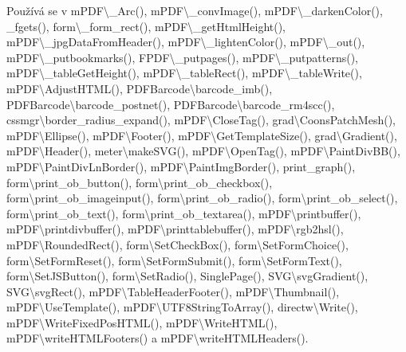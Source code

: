 Používá se v m\-P\-D\-F\textbackslash{}\-\_\-\-Arc(), m\-P\-D\-F\textbackslash{}\-\_\-conv\-Image(), m\-P\-D\-F\textbackslash{}\-\_\-darken\-Color(), \-\_\-fgets(), form\textbackslash{}\-\_\-form\-\_\-rect(), m\-P\-D\-F\textbackslash{}\-\_\-get\-Html\-Height(), m\-P\-D\-F\textbackslash{}\-\_\-jpg\-Data\-From\-Header(), m\-P\-D\-F\textbackslash{}\-\_\-lighten\-Color(), m\-P\-D\-F\textbackslash{}\-\_\-out(), m\-P\-D\-F\textbackslash{}\-\_\-putbookmarks(), F\-P\-D\-F\textbackslash{}\-\_\-putpages(), m\-P\-D\-F\textbackslash{}\-\_\-putpatterns(), m\-P\-D\-F\textbackslash{}\-\_\-table\-Get\-Height(), m\-P\-D\-F\textbackslash{}\-\_\-table\-Rect(), m\-P\-D\-F\textbackslash{}\-\_\-table\-Write(), m\-P\-D\-F\textbackslash{}\-Adjust\-H\-T\-M\-L(), P\-D\-F\-Barcode\textbackslash{}barcode\-\_\-imb(), P\-D\-F\-Barcode\textbackslash{}barcode\-\_\-postnet(), P\-D\-F\-Barcode\textbackslash{}barcode\-\_\-rm4scc(), cssmgr\textbackslash{}border\-\_\-radius\-\_\-expand(), m\-P\-D\-F\textbackslash{}\-Close\-Tag(), grad\textbackslash{}\-Coons\-Patch\-Mesh(), m\-P\-D\-F\textbackslash{}\-Ellipse(), m\-P\-D\-F\textbackslash{}\-Footer(), m\-P\-D\-F\textbackslash{}\-Get\-Template\-Size(), grad\textbackslash{}\-Gradient(), m\-P\-D\-F\textbackslash{}\-Header(), meter\textbackslash{}make\-S\-V\-G(), m\-P\-D\-F\textbackslash{}\-Open\-Tag(), m\-P\-D\-F\textbackslash{}\-Paint\-Div\-B\-B(), m\-P\-D\-F\textbackslash{}\-Paint\-Div\-Ln\-Border(), m\-P\-D\-F\textbackslash{}\-Paint\-Img\-Border(), print\-\_\-graph(), form\textbackslash{}print\-\_\-ob\-\_\-button(), form\textbackslash{}print\-\_\-ob\-\_\-checkbox(), form\textbackslash{}print\-\_\-ob\-\_\-imageinput(), form\textbackslash{}print\-\_\-ob\-\_\-radio(), form\textbackslash{}print\-\_\-ob\-\_\-select(), form\textbackslash{}print\-\_\-ob\-\_\-text(), form\textbackslash{}print\-\_\-ob\-\_\-textarea(), m\-P\-D\-F\textbackslash{}printbuffer(), m\-P\-D\-F\textbackslash{}printdivbuffer(), m\-P\-D\-F\textbackslash{}printtablebuffer(), m\-P\-D\-F\textbackslash{}rgb2hsl(), m\-P\-D\-F\textbackslash{}\-Rounded\-Rect(), form\textbackslash{}\-Set\-Check\-Box(), form\textbackslash{}\-Set\-Form\-Choice(), form\textbackslash{}\-Set\-Form\-Reset(), form\textbackslash{}\-Set\-Form\-Submit(), form\textbackslash{}\-Set\-Form\-Text(), form\textbackslash{}\-Set\-J\-S\-Button(), form\textbackslash{}\-Set\-Radio(), Single\-Page(), S\-V\-G\textbackslash{}svg\-Gradient(), S\-V\-G\textbackslash{}svg\-Rect(), m\-P\-D\-F\textbackslash{}\-Table\-Header\-Footer(), m\-P\-D\-F\textbackslash{}\-Thumbnail(), m\-P\-D\-F\textbackslash{}\-Use\-Template(), m\-P\-D\-F\textbackslash{}\-U\-T\-F8\-String\-To\-Array(), directw\textbackslash{}\-Write(), m\-P\-D\-F\textbackslash{}\-Write\-Fixed\-Pos\-H\-T\-M\-L(), m\-P\-D\-F\textbackslash{}\-Write\-H\-T\-M\-L(), m\-P\-D\-F\textbackslash{}write\-H\-T\-M\-L\-Footers() a m\-P\-D\-F\textbackslash{}write\-H\-T\-M\-L\-Headers().

